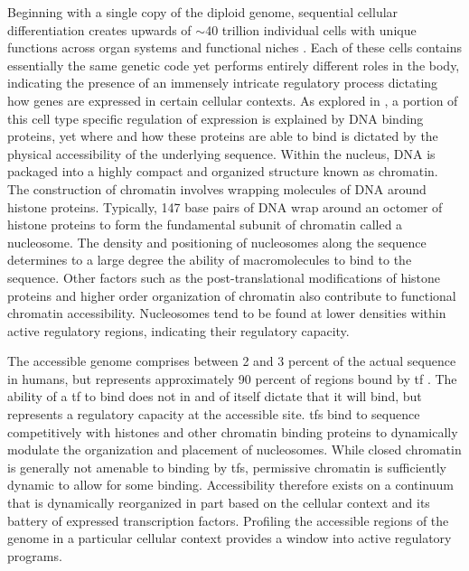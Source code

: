 Beginning with a single copy of the diploid genome, sequential cellular differentiation creates upwards of $\sim$40 trillion individual cells with unique functions across organ systems and functional niches \cite{Quinlan2010}. Each of these cells contains essentially the same genetic code yet performs entirely different roles in the body, indicating the presence of an immensely intricate regulatory process dictating how genes are expressed in certain cellular contexts. As explored in , a portion of this cell type specific regulation of expression is explained by DNA binding proteins, yet where and how these proteins are able to bind is dictated by the physical accessibility of the underlying sequence. Within the nucleus, DNA is packaged into a highly compact and organized structure known as chromatin. The construction of chromatin involves wrapping molecules of DNA around histone proteins. Typically, 147 base pairs of DNA wrap around an octomer of histone proteins to form the fundamental subunit of chromatin called a nucleosome. The density and positioning of nucleosomes along the sequence determines to a large degree the ability of macromolecules to bind to the sequence. Other factors such as the post-translational modifications of histone proteins and higher order organization of chromatin also contribute to functional chromatin accessibility. Nucleosomes tend to be found at lower densities within active regulatory regions, indicating their regulatory capacity. 

The accessible genome comprises between 2 and 3 percent of the actual sequence in humans, but represents approximately 90 percent of regions bound by \gls{tf} \cite{Thurman2012}. The ability of a \gls{tf} to bind does not in and of itself dictate that it will bind, but represents a regulatory capacity at the accessible site. \Glspl{tf} bind to sequence competitively with histones and other chromatin binding proteins to dynamically modulate the organization and placement of nucleosomes. While closed chromatin is generally not amenable to binding by \glspl{tf}, permissive chromatin is sufficiently dynamic to allow for some binding. Accessibility therefore exists on a continuum that is dynamically reorganized in part based on the cellular context and its battery of expressed transcription factors.  Profiling the accessible regions of the genome in a particular cellular context provides a window into active regulatory programs. 


